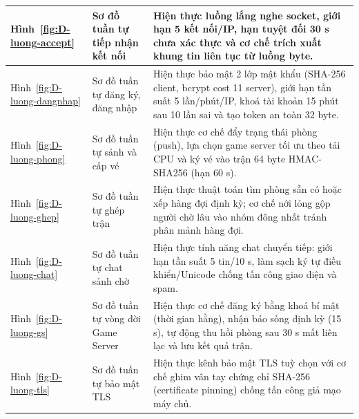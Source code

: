 \begin{center}
\begin{tabularx}{\linewidth}{|L{2.2cm}|L{4.2cm}|Y|}
Hình~\ref{fig:D-luong-accept} & Sơ đồ tuần tự tiếp nhận kết nối & Hiện thực luồng lắng nghe socket, giới hạn 5 kết nối/IP, hạn tuyệt đối 30 s chưa xác thực và cơ chế trích xuất khung tin liên tục từ luồng byte. \\ \hline
Hình~\ref{fig:D-luong-dangnhap} & Sơ đồ tuần tự đăng ký, đăng nhập & Hiện thực bảo mật 2 lớp mật khẩu (SHA-256 client, bcrypt cost 11 server), giới hạn tần suất 5 lần/phút/IP, khoá tài khoản 15 phút sau 10 lần sai và tạo token an toàn 32 byte. \\ \hline
Hình~\ref{fig:D-luong-phong} & Sơ đồ tuần tự sảnh và cấp vé & Hiện thực cơ chế đẩy trạng thái phòng (push), lựa chọn game server tối ưu theo tải CPU và ký vé vào trận 64 byte HMAC-SHA256 (hạn 60 s). \\ \hline
Hình~\ref{fig:D-luong-ghep} & Sơ đồ tuần tự ghép trận & Hiện thực thuật toán tìm phòng sẵn có hoặc xếp hàng đợi định kỳ; cơ chế nới lỏng gộp người chờ lâu vào nhóm đông nhất tránh phân mảnh hàng đợi. \\ \hline
Hình~\ref{fig:D-luong-chat} & Sơ đồ tuần tự chat sảnh chờ & Hiện thực tính năng chat chuyển tiếp: giới hạn tần suất 5 tin/10 s, làm sạch ký tự điều khiển/Unicode chống tấn công giao diện và spam. \\ \hline
Hình~\ref{fig:D-luong-gs} & Sơ đồ tuần tự vòng đời Game Server & Hiện thực cơ chế đăng ký bằng khoá bí mật (thời gian hằng), nhận báo sống định kỳ (15 s), tự động thu hồi phòng sau 30 s mất liên lạc và lưu kết quả trận. \\ \hline
Hình~\ref{fig:D-luong-tls} & Sơ đồ tuần tự bảo mật TLS & Hiện thực kênh bảo mật TLS tuỳ chọn với cơ chế ghim vân tay chứng chỉ SHA-256 (certificate pinning) chống tấn công giả mạo máy chủ. \\ \hline
\end{tabularx}
\end{center}
